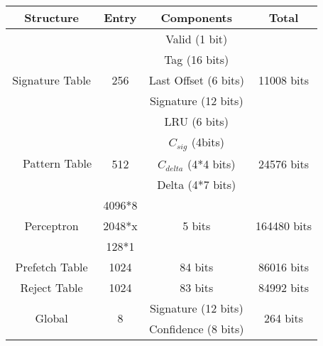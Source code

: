 \begin{table}[]
    \centering
    \begin{tabular}{|c|c|c|c|}
    \hline
        \textbf{Structure} &
        \textbf{Entry} &
        \textbf{Components} &
        \textbf{Total} \\
    \hline
        \multirow{5}{2.2cm}{Signature Table} &      & Valid (1 bit)        &             \\
                                             &      & Tag (16 bits)        &             \\
                                             & 256  & Last Offset (6 bits) & 11008 bits  \\  
                                             &      & Signature (12 bits)  &             \\
                                             &      & LRU (6 bits)         &             \\
    \hline
        \multirow{3}{2.2cm}{~~Pattern Table} &      & $C_{sig}$ (4bits)      &               \\
                                             & 512  & $C_{delta}$ (4*4 bits) & 24576 bits    \\
                                             &      & Delta (4*7 bits)       &               \\
    \hline
        \multirow{3}{1.5cm}{Perceptron\newline}     & 4096*8    &            &              \\
        \multirow{2}{0.9cm}{Weights}                 & 2048*x    & 5 bits     & 164480 bits  \\
                                                    & 128*1     &            &              \\
    \hline
        Prefetch Table\footnotemark[1]             & 1024      & 84 bits    & 86016 bits   \\
    \hline
        Reject Table\footnotemark[2]               & 1024      & 83 bits    & 84992 bits   \\
    \hline
        \multirow{4}{1cm}{Global\newline\newline}   & \multirow{4}{0.2cm}{8} & Signature (12 bits)  & \multirow{4}{1.1cm}{264 bits} \\
        \multirow{3}{1.1cm}{History\newline}        &                        & Confidence (8 bits)  &                               \\

\end{tabular}
\end{table}
